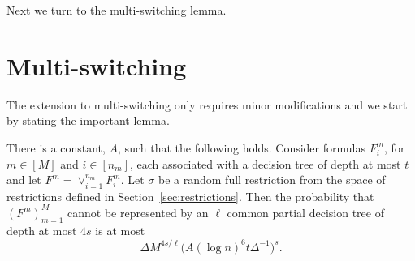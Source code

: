 \documentclass{article}\usepackage[a4paper,margin=20mm]{geometry}
\begin{document}
Next we turn to the multi-switching lemma.

\section{Multi-switching} \label{sec:mswitch}

The extension to multi-switching only
requires minor modifications and we start by
stating the important lemma.

\begin{lemma}   \label{lemma:multiswitch}
  There is a constant, $A$, such that the
  following holds.
  Consider formulas $F_i^m$, for $m \in [M]$
  and $i \in [n_m]$, each associated with a decision tree of
  depth at most $t$ and let $F^m= \lor_{i=1}^{n_m} F_i^m$.
  Let $\sigma$ be a random full restriction from the 
  space of restrictions defined in Section~\ref{sec:restrictions}.
  Then the probability that $(F^m)_{m=1}^M$
  cannot be represented by an $\ell$ common partial
  decision tree of depth at most $4s$ is at most
  $$
  \Delta M^{4s/\ell} \big(A(\log n)^{6} t \Delta^{-1}\big)^{s}.$$
\end{lemma}
\end{document}
